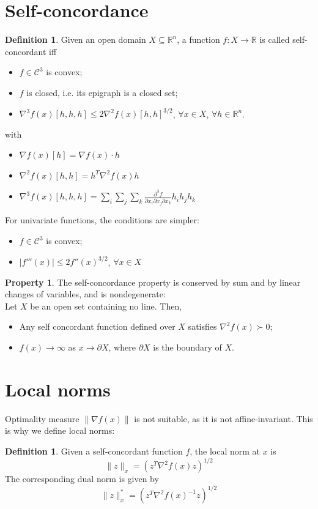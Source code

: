 \documentclass[12pt, openany]{report}
\newcommand{\R}{\mathbb{R}}
\theoremstyle{definition}
\newtheorem{definition}[thm]{Definition}
\newtheorem{prop}[thm]{Property}
\begin{document}
\section{Self-concordance}
\begin{definition}
    Given an open domain $X\subseteq \R^n$, a function $f:X\rightarrow \R$ is called self-concordant iff 
    \begin{itemize}
        \item $f\in \mathcal{C}^3$ is convex;
        \item $f$ is closed, i.e. its epigraph is a closed set;
        \item $\nabla^3f(x)[h,h,h]\le 2\nabla^2 f(x)[h,h]^{3/2}$, $\forall x\in X$, $\forall h\in \R^n$.
    \end{itemize}
    with 
    \begin{itemize}
        \item $\nabla f(x)[h] = \nabla f(x) \cdot h$
        \item $\nabla^2f(x)[h,h] = h^T\nabla^2 f(x)h$
        \item $\nabla^3f(x)[h,h,h] = \sum_i\sum_j\sum_k \frac{\partial^3 f}{\partial x_i \partial x_j \partial x_k}h_ih_jh_k$
    \end{itemize}
\end{definition}
For univariate functions, the conditions are simpler:
\begin{itemize}
    \item $f\in \mathcal{C}^3$ is convex;
    \item $|f'''(x)|\le 2f''(x)^{3/2}$, $\forall x \in X$
\end{itemize}
\begin{prop}
    The self-concordance property is conserved by sum and by linear changes of variables, and is nondegenerate:\\
    Let $X$ be an open set containing no line. Then,
    \begin{itemize}
        \item Any self concordant function defined over $X$ satisfies $\nabla^2f(x)\succ 0$;
        \item $f(x)\rightarrow \infty$ as $x\rightarrow \partial X$, where $\partial X$ is the boundary of $X$.
    \end{itemize}
\end{prop}
\section{Local norms}
Optimality measure $\lVert \nabla f(x)\rVert$ is not suitable, as it is not affine-invariant. This is why we define local norms:
\begin{definition}
    Given a self-concordant function $f$, the local norm at $x$ is 
    \begin{equation}
        \lVert z\rVert_x = (z^T\nabla^2f(x)z)^{1/2}
    \end{equation}
    The corresponding dual norm is given by
    \begin{equation}
        \lVert z\rVert_x^* = (z^T\nabla^2f(x)^{-1}z)^{1/2}
    \end{equation}
\end{definition}
\end{document}
